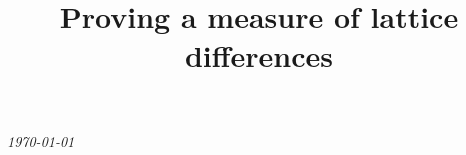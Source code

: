 \documentclass[preprint]{iucr}              %
\numberwithin{equation}{section}
\begin{document}
	
	
	
	
	
	
	
	
	
	
	
	{\LARGE \emph{\today}} \\
	\title{Proving a measure of lattice differences}
	
	
\end{document}
